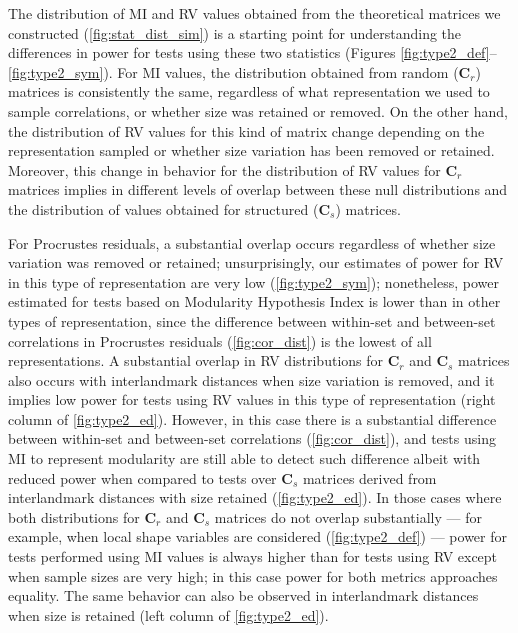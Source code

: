 \documentclass[12pt,]{article}
\begin{document}
The distribution of MI and RV values obtained from the theoretical
matrices we constructed (\autoref{fig:stat_dist_sim}) is a starting
point for understanding the differences in power for tests using these
two statistics (Figures \ref{fig:type2_def}--\ref{fig:type2_sym}). For
MI values, the distribution obtained from random ($\mathbf{C}_r$)
matrices is consistently the same, regardless of what representation we
used to sample correlations, or whether size was retained or removed. On
the other hand, the distribution of RV values for this kind of matrix
change depending on the representation sampled or whether size variation
has been removed or retained. Moreover, this change in behavior for the
distribution of RV values for $\mathbf{C}_r$ matrices implies in
different levels of overlap between these null distributions and the
distribution of values obtained for structured ($\mathbf{C}_s$)
matrices.

For Procrustes residuals, a substantial overlap occurs regardless of
whether size variation was removed or retained; unsurprisingly, our
estimates of power for RV in this type of representation are very low
(\autoref{fig:type2_sym}); nonetheless, power estimated for tests based
on Modularity Hypothesis Index is lower than in other types of
representation, since the difference between within-set and between-set
correlations in Procrustes residuals (\autoref{fig:cor_dist}) is the
lowest of all representations. A substantial overlap in RV distributions
for $\mathbf{C}_r$ and $\mathbf{C}_s$ matrices also occurs with
interlandmark distances when size variation is removed, and it implies
low power for tests using RV values in this type of representation
(right column of \autoref{fig:type2_ed}). However, in this case there is
a substantial difference between within-set and between-set correlations
(\autoref{fig:cor_dist}), and tests using MI to represent modularity are
still able to detect such difference albeit with reduced power when
compared to tests over $\mathbf{C}_s$ matrices derived from
interlandmark distances with size retained (\autoref{fig:type2_ed}). In
those cases where both distributions for $\mathbf{C}_r$ and
$\mathbf{C}_s$ matrices do not overlap substantially --- for example,
when local shape variables are considered (\autoref{fig:type2_def}) ---
power for tests performed using MI values is always higher than for
tests using RV except when sample sizes are very high; in this case
power for both metrics approaches equality. The same behavior can also
be observed in interlandmark distances when size is retained (left
column of \autoref{fig:type2_ed}).
\end{document}

